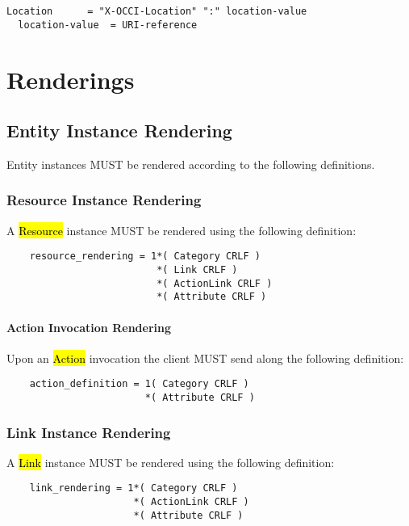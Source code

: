 \documentclass[10pt,a4paper]{article}
\begin{document}
\begin{verbatim}
Location      = "X-OCCI-Location" ":" location-value
  location-value  = URI-reference
\end{verbatim}

\section{Renderings}

\subsection{Entity Instance Rendering}

Entity instances MUST be rendered according to the following definitions.

\subsubsection{Resource Instance Rendering}

A \hl{Resource} instance MUST be rendered using the following definition:

\begin{verbatim}
	resource_rendering = 1*( Category CRLF )
    	                  *( Link CRLF )
    	                  *( ActionLink CRLF )
        	              *( Attribute CRLF )
\end{verbatim}

\paragraph{Action Invocation Rendering}

Upon an \hl{Action} invocation the client MUST send along the following definition:

\begin{verbatim}
	action_definition = 1( Category CRLF )
        	            *( Attribute CRLF )
\end{verbatim}

\subsubsection{Link Instance Rendering}

A \hl{Link} instance MUST be rendered using the following definition:

\begin{verbatim}
	link_rendering = 1*( Category CRLF )
    	              *( ActionLink CRLF )
        	          *( Attribute CRLF )
\end{verbatim}
\end{document}
